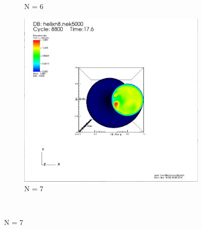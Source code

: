 \documentclass[12pt]{article}
\begin{document}
\begin{figure}[h]
\begin{subfigure}[h]{0.400\textwidth}
		\caption{N = 6}
	\end{subfigure}
	\begin{subfigure}[h]{0.400\textwidth}
		\centering
		\includegraphics[width=\textwidth]{z8c8800.png}
		\caption{N = 7}
	\end{subfigure}\\ 
\end{figure}\\\\
\end{document}
